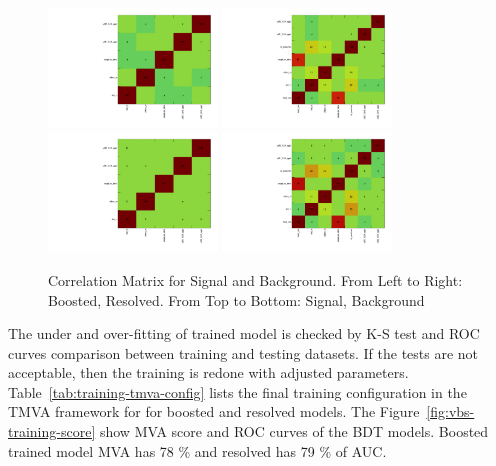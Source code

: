 \begin{figure}[!ht]
  \centering
  \includegraphics[width=0.4\textwidth]{analysis_plots/tmva_plots/zv_BDTG14_CorrelationMatrixS.pdf}
  \includegraphics[width=0.4\textwidth]{analysis_plots/tmva_plots/zjj_BDTG14_CorrelationMatrixS.pdf} \\
  \includegraphics[width=0.4\textwidth]{analysis_plots/tmva_plots/zv_BDTG14_CorrelationMatrixB.pdf}
  \includegraphics[width=0.4\textwidth]{analysis_plots/tmva_plots/zjj_BDTG14_CorrelationMatrixB.pdf} \\
  \caption[Correlation Matrix for Signal and Background]%
  {Correlation Matrix for Signal and Background. From Left to Right: Boosted, Resolved.
    From Top to Bottom: Signal, Background}%
  \label{fig:vbs-training-correlation}
\end{figure}

The under and over-fitting of trained model is checked by \gls{K-S} test
and \gls{ROC} curves comparison between training and testing datasets.
If the tests are not acceptable, then the training is redone with adjusted parameters.
Table~\ref{tab:training-tmva-config} lists the final
training configuration in the \gls{TMVA} framework for
for boosted and resolved models.
The Figure~\ref{fig:vbs-training-score} show \gls{MVA} score and \gls{ROC} curves
of the BDT models. Boosted trained model \gls{MVA} has 78 \% and resolved
has 79 \% of \gls{AUC}.

